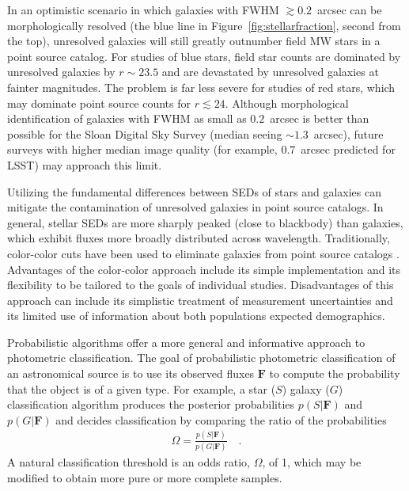 \documentclass[12pt,preprint]{aastex}
\newcommand{\datavector}[1]{\boldsymbol{#1}}
\begin{document}
In an optimistic scenario in which galaxies with FWHM $\gtrsim 0.2$~arcsec can
be morphologically resolved (the blue line in
Figure~\ref{fig:stellarfraction}, second from the top), unresolved
galaxies will still greatly outnumber field MW stars in a point source
catalog.  For studies of blue stars, field star counts are dominated
by unresolved galaxies by $r\sim23.5$ and are devastated by unresolved
galaxies at fainter magnitudes. The problem is far less severe for
studies of red stars, which may dominate point source counts for
$r\lesssim24$. Although morphological identification of galaxies with
FWHM as small as $0.2$~arcsec is better than possible for the Sloan Digital Sky
Survey (median seeing $\sim1.3$~arcsec), future surveys with
higher median image quality (for example, $0.7$~arcsec predicted for LSST) may
approach this limit.

Utilizing the fundamental differences between SEDs of stars and
galaxies can mitigate the contamination of unresolved galaxies in
point source catalogs.  In general, stellar SEDs are more sharply
peaked (close to blackbody) than galaxies, which exhibit fluxes more
broadly distributed across wavelength.  Traditionally, color-color
cuts have been used to eliminate galaxies from point source catalogs
\citep[e.g.,][]{gould92a,reitzel98a,daddi04a}.  Advantages of the
color-color approach include its simple implementation and its
flexibility to be tailored to the goals of individual studies.
Disadvantages of this approach can include its simplistic treatment of
measurement uncertainties and its limited use of information about
both populations expected demographics.

Probabilistic algorithms offer a more general and informative approach
to photometric classification.  The goal of probabilistic photometric
classification of an astronomical source is to use its observed fluxes
$\datavector{F}$ to compute the probability that the object is of a
given type.  For example, a star ($S$) galaxy ($G$) classification
algorithm produces the posterior probabilities $p(S|\datavector{F})$ and
$p(G|\datavector{F})$ and decides classification by comparing the
ratio of the probabilities
\begin{eqnarray}\displaystyle
\Omega = \frac{p(S|\datavector{F})}{p(G|\datavector{F})} 
\quad .
\label{eqn:oddsratio}
\end{eqnarray}
A natural classification threshold is an odds ratio,
$\Omega$, of 1, which may be modified to obtain more pure or more
complete samples.
\end{document}
